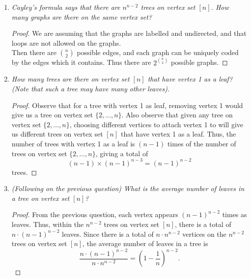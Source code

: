 \documentclass{article}
\begin{document}
\begin{enumerate}[label={\bf Q\arabic*:}]
\begin{proof}
      (d)$\Rightarrow$(c): Assume (d) holds but the graph $G$ is not
      connected. Then $G$ is the disjoint union of finitely many connected
      subgraphs, each being acyclic since $G$ is acyclic. Then from (e) and
      the equivalence of (e) with (c), the number of edges of each subgraph
      is one less than its number of vertices. Then $G$ would have $n-k$
      edges, where $k$ is the number of disjoint subgraphs. This
      contradicts $G$ having $n-1$ edges.
    \end{proof}

  \item \it Cayley's formula says that there are $n^{n-2}$ trees on vertex
    set $[n]$. How many graphs are there on the same vertex set?

    \begin{proof}
      We are assuming that the graphs are labelled and undirected, and that
      loops are not allowed on the graphs. \\

      Then there are $\binom{n}{2}$ possible edges, and each graph can be
      uniquely coded by the edges which it contains. Thus there are
      $2^{\binom{n}{2}}$ possible graphs.
    \end{proof}

  \item \it How many trees are there on vertex set $[n]$ that have vertex 1
    as a leaf? (Note that such a tree may have many other leaves).

    \begin{proof}
      Observe that for a tree with vertex 1 as leaf, removing vertex 1
      would give us a tree on vertex set $\{2,\ldots,n\}$. Also observe
      that given any tree on vertex set $\{2,\ldots,n\}$, choosing
      different vertices to attach vertex 1 to will give us different trees
      on vertex set $[n]$ that have vertex 1 as a leaf. Thus, the number of
      trees with vertex 1 as a leaf is $(n-1)$ times of the number of trees
      on vertex set $\{2,\ldots,n\}$, giving a total of
      \[(n-1)\times(n-1)^{n-3} = (n-1)^{n-2}\]
      trees.
    \end{proof}

  \item \it (Following on the previous question) What is the average number
    of leaves in a tree on vertex set $[n]$?

    \begin{proof}
      From the previous question, each vertex appears $(n-1)^{n-2}$ times
      as leaves. Thus, within the $n^{n-2}$ trees on vertex set $[n]$,
      there is a total of $n\cdot(n-1)^{n-2}$ leaves. Since there is a
      total of $n\cdot n^{n-2}$ vertices on the $n^{n-2}$ trees on vertex
      set $[n]$, the average number of leaves in a tree is
      \[\frac{n\cdot(n-1)^{n-2}}{n\cdot n^{n-2}} =
      \left(1-\frac{1}{n}\right)^{n-2}.\]
    \end{proof}
\end{enumerate}
\end{document}
